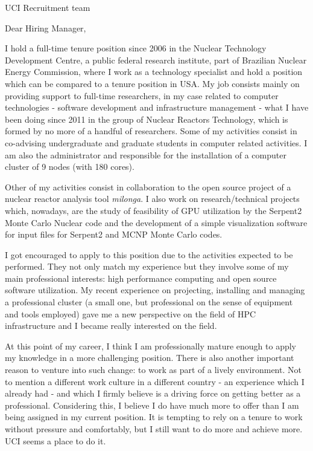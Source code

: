 \documentclass{letter}
\begin{document}
\begin{letter}{UCI Recruitment team}

  \opening{Dear Hiring Manager,}
  
  I hold a full-time tenure position since 2006 in the Nuclear Technology Development Centre, a public federal
  research institute, part of Brazilian Nuclear Energy Commission, where I work as a technology
  specialist and hold a position which can be compared to a tenure position in USA. My job consists mainly on
  providing support to full-time researchers, in my case
  related to computer technologies - software development and infrastructure management - what I have been
  doing since 2011 in the group of Nuclear Reactors Technology, which is formed by no more of a handful of researchers.
  Some of my activities consist in co-advising undergraduate and graduate students in computer related
  activities. I am also the administrator and responsible for the installation of a
  computer cluster of 9 nodes (with 180 cores).

  Other of my activities consist in collaboration to the open source project of a nuclear reactor
  analysis tool \textit{milonga}. I also work on research/technical projects which, nowadays, are the study of
  feasibility of GPU utilization by the Serpent2 Monte Carlo Nuclear code and the development of
  a simple visualization software for input files for Serpent2 and MCNP Monte Carlo codes.
  
  I got encouraged to apply to this position due to the activities expected to be performed. They not only
  match my experience but they involve some of my main professional interests: high performance computing
  and open source software utilization. %
  My recent experience on projecting, installing and managing a professional
  cluster (a small one, but professional on the sense of equipment and tools employed) gave me a new perspective
  on the field of HPC infrastructure and I became really interested on the field.
  
  At this point of my career, I think I am professionally mature enough to apply my knowledge in a more
  challenging position. There is also another important reason to venture into such change: to work
  as part of a lively environment. Not to mention a different work culture in a different country - an
  experience which I already had - and which I firmly believe is a driving force on getting better as a professional.
  Considering this, I believe I do have much more to offer than I am being assigned in my current position. 
  It is tempting to rely on a tenure to work without pressure and comfortably, but I still want to do more and
  achieve more. UCI seems a place to do it.
  

\end{letter}
\end{document}
